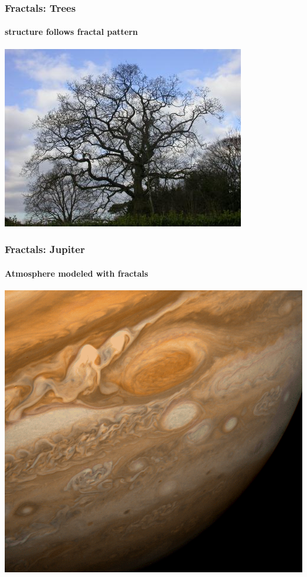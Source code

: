 \documentclass[10pt]{beamer}
\begin{document}
\begin{frame}
\frametitle{Fractals: Trees}
\framesubtitle{structure follows fractal pattern}
\begin{center}
\includegraphics[height=0.9\textheight]{figs/fractal6}
\end{center}
\end{frame}
\begin{frame}
\frametitle{Fractals: Jupiter}
\framesubtitle{Atmosphere modeled with fractals}
\begin{center}
\includegraphics[height=0.9\textheight]{figs/fractal7}
\end{center}
\end{frame}
\end{document}
